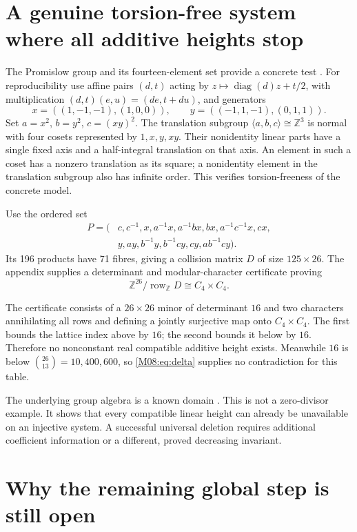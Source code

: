 \documentclass[11pt,a4paper,oneside]{report}
\theoremstyle{definition}
\theoremstyle{remark}
\DeclareMathOperator{\diag}{diag}
\newcommand{\Z}{\mathbb Z}
\begin{document}
\section{A genuine torsion-free system where all additive heights stop}

The Promislow group and its fourteen-element set provide a concrete
test \cite{B:CP}. For reproducibility use affine pairs $(d,t)$ acting
by $z\mapsto\diag(d)z+t/2$, with multiplication
$(d,t)(e,u)=(de,t+du)$, and generators
\[
x=((1,-1,-1),(1,0,0)),\qquad
y=((-1,1,-1),(0,1,1)).
\]
Set $a=x^2$, $b=y^2$, $c=(xy)^2$. The translation subgroup
$\langle a,b,c\rangle\cong\Z^3$ is normal with four cosets
represented by $1,x,y,xy$. Their nonidentity linear parts have
a single fixed axis and a half-integral translation on that axis.
An element in such a coset has a nonzero translation as its square;
a nonidentity element in the translation subgroup also has infinite
order. This verifies torsion-freeness of the concrete model.

Use the ordered set
\begin{align*}
P=(&c,c^{-1},x,a^{-1}x,a^{-1}bx,bx,a^{-1}c^{-1}x,cx,\\
   &y,ay,b^{-1}y,b^{-1}cy,cy,ab^{-1}cy).
\end{align*}
Its 196 products have 71 fibres, giving a collision matrix
$D$ of size $125\times26$. The appendix supplies a determinant
and modular-character certificate proving
\begin{equation}\label{M08:eq:promislow}
\boxed{\Z^{26}/\operatorname{row}_{\Z}D\cong C_4\times C_4.}
\end{equation}

The certificate consists of a $26\times26$ minor of determinant
$16$ and two characters annihilating all rows and defining a jointly
surjective map onto $C_4\times C_4$.
The first bounds the lattice index above by $16$; the second
bounds it below by $16$. Therefore no nonconstant real compatible
additive height exists. Meanwhile $16$ is below
$\binom{26}{13}=10{,}400{,}600$, so \eqref{M08:eq:delta} supplies
no contradiction for this table.

The underlying group algebra is a known domain \cite[Theorem 8.2]{B:CP}.
This is not a zero-divisor example. It shows that every compatible
linear height can already be unavailable on an injective system.
A successful universal deletion requires additional coefficient
information or a different, proved decreasing invariant.

\section{Why the remaining global step is still open}
\end{document}
